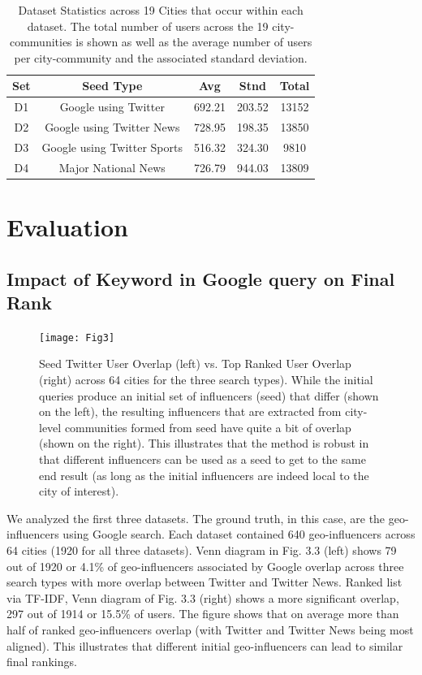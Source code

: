 \begin{table}
\small
\renewcommand{\arraystretch}{1.2}
\caption[Dataset Statistics across 19 Cities that occur within each dataset.]{Dataset Statistics across 19 Cities that occur within each dataset. The total number of users across the 19 city-communities is shown as well as the average number of users per city-community and the associated standard deviation.}
\label{table_ch3_1}
\centering
\begin{tabular}{|c|c|c|c|c|}
\hline
\bfseries Set & \bfseries Seed Type & \bfseries Avg & \bfseries Stnd & \bfseries Total \\
\hline
D1&Google using Twitter&692.21&203.52&13152\\
\hline
D2&Google using Twitter News&728.95&198.35&13850\\
\hline
D3&Google using Twitter Sports&516.32&324.30&9810\\
\hline
D4&Major National News&726.79&944.03&13809\\
\hline
\end{tabular}
\end{table}

\section{Evaluation}

\subsection{Impact of Keyword in Google query on Final Rank}

\begin{figure}[!t]
\centering
\texttt{[image: Fig3]}
\caption[Seed vs. Top Ranked Influencer Overlap Venn Diagram across 64 cities]{Seed Twitter User Overlap (left) vs. Top Ranked User Overlap (right) across 64 cities for the three search types). While the initial queries produce an initial set of influencers (seed) that differ (shown on the left), the resulting influencers that are extracted from city-level communities formed from seed have quite a bit of overlap (shown on the right). This illustrates that the method is robust in that different influencers can be used as a seed to get to the same end result (as long as the initial influencers are indeed local to the city of interest).}
\label{fig_ch3_3}
\end{figure}

We analyzed the first three datasets. The ground truth, in this case, are the geo-influencers using Google search. Each dataset contained 640 geo-influencers across 64 cities (1920 for all three datasets). Venn diagram in Fig. 3.3 (left) shows 79 out of 1920 or 4.1\% of geo-influencers associated by Google overlap across three search types with more overlap between Twitter and Twitter News. Ranked list via TF-IDF, Venn diagram of Fig. 3.3 (right) shows a more significant overlap, 297 out of 1914 or 15.5\% of users. The figure shows that on average more than half of ranked geo-influencers overlap (with Twitter and Twitter News being most aligned). This illustrates that different initial geo-influencers can lead to similar final rankings.


